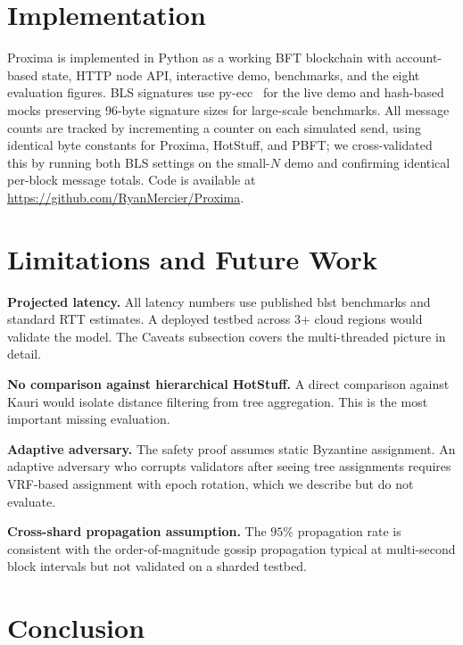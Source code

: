 \documentclass[conference]{IEEEtran}
\begin{document}
\section{Implementation}

Proxima is implemented in Python as a working BFT blockchain with account-based state, HTTP node API, interactive demo, benchmarks, and the eight evaluation figures. BLS signatures use py-ecc~\cite{pyecc} for the live demo and hash-based mocks preserving 96-byte signature sizes for large-scale benchmarks. All message counts are tracked by incrementing a counter on each simulated send, using identical byte constants for Proxima, HotStuff, and PBFT; we cross-validated this by running both BLS settings on the small-$N$ demo and confirming identical per-block message totals. Code is available at \url{https://github.com/RyanMercier/Proxima}.

\section{Limitations and Future Work}

\textbf{Projected latency.} All latency numbers use published blst benchmarks and standard RTT estimates. A deployed testbed across 3+ cloud regions would validate the model. The Caveats subsection covers the multi-threaded picture in detail.

\textbf{No comparison against hierarchical HotStuff.} A direct comparison against Kauri would isolate distance filtering from tree aggregation. This is the most important missing evaluation.

\textbf{Adaptive adversary.} The safety proof assumes static Byzantine assignment. An adaptive adversary who corrupts validators after seeing tree assignments requires VRF-based assignment with epoch rotation, which we describe but do not evaluate.

\textbf{Cross-shard propagation assumption.} The $95\%$ propagation rate is consistent with the order-of-magnitude gossip propagation typical at multi-second block intervals but not validated on a sharded testbed.

\section{Conclusion}
\end{document}
